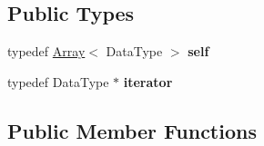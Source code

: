 \subsection*{Public Types}
\begin{DoxyCompactItemize}
\item 
\mbox{\label{classez_1_1objects_1_1Array_aca95c7484bdd1ac9a1c80be3faa53ca4}} 
typedef \hyperlink{classez_1_1objects_1_1Array}{Array}$<$ Data\+Type $>$ {\bfseries self}
\item 
\mbox{\label{classez_1_1objects_1_1Array_ad9930b3ad47ac4f2165436a1a2509a35}} 
typedef Data\+Type $\ast$ {\bfseries iterator}
\end{DoxyCompactItemize}
\subsection*{Public Member Functions}
